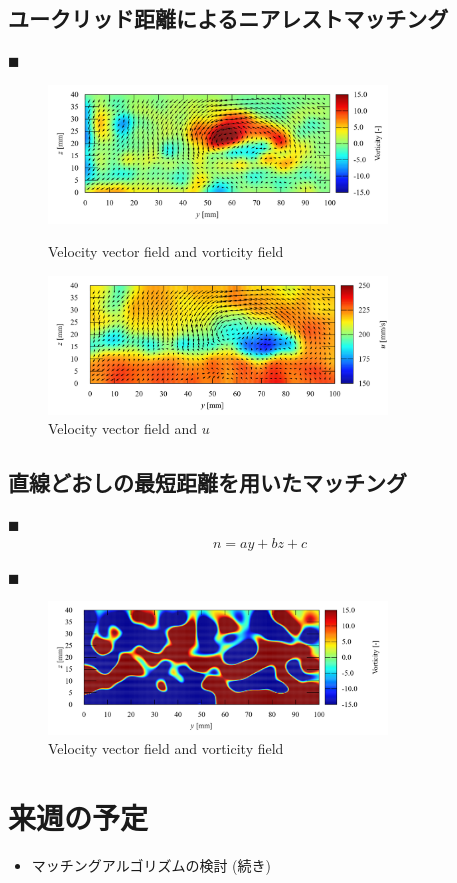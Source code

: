 \documentclass[twocolumn,a4j]{jsarticle}
\begin{document}
\newpage
\subsection{ユークリッド距離によるニアレストマッチング}
$\blacksquare$\;
\begin{figure}[htbp]
  \centering
  \includegraphics[width=90mm]{images/vorticity.png}
  \caption{Velocity vector field and vorticity field}
  \includegraphics[width=90mm]{images/velocity.png}
  \caption{Velocity vector field and $u$}
\end{figure}

\subsection{直線どおしの最短距離を用いたマッチング}
$\blacksquare$\;
\begin{eqnarray*}
  n = a y + b z + c
\end{eqnarray*}

$\blacksquare$\;
\begin{figure}[htbp]
  \centering
  \includegraphics[width=90mm]{images/vorticity_miss.png}
  \caption{Velocity vector field and vorticity field}
\end{figure}

\section{来週の予定}
\begin{itemize}
  \item マッチングアルゴリズムの検討 (続き)
\end{itemize}
\end{document}
